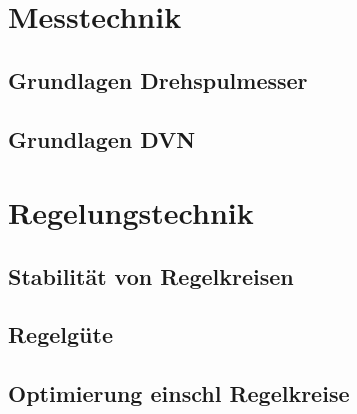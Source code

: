 \documentclass[a4paper, 11pt]{article}
\begin{document}
\section{Messtechnik}

\subsection{Grundlagen Drehspulmesser}


\subsection{Grundlagen DVN}


\section{Regelungstechnik}
\subsection{Stabilität von Regelkreisen}


\subsection{Regelgüte}


\subsection{Optimierung einschl Regelkreise}

\end{document}
